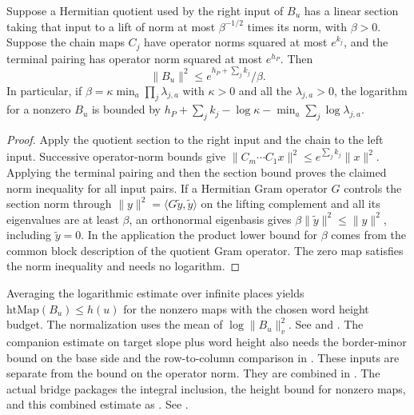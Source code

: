 \begin{lemma}\label{geo:descent}
Suppose a Hermitian quotient used by the right input of \(B_u\) has a linear section taking that input to a lift of norm at most \(\beta^{-1/2}\) times its norm, with \(\beta>0\). Suppose the chain maps \(C_j\) have operator norms squared at most \(e^{k_j}\), and the terminal pairing has operator norm squared at most \(e^{h_P}\). Then
\[
 \|B_u\|^2\le e^{h_P+\sum_j k_j}/\beta.
\]
In particular, if \(\beta=\kappa\min_a\prod_j\lambda_{j,a}\) with \(\kappa>0\) and all the \(\lambda_{j,a}>0\), the logarithm for a nonzero \(B_u\) is bounded by \(h_P+\sum_j k_j-\log\kappa-\min_a\sum_j\log\lambda_{j,a}\).
\end{lemma}
\begin{proof}
Apply the quotient section to the right input and the chain to the left input. Successive operator-norm bounds give \(\|C_m\cdots C_1 x\|^2\le e^{\sum_j k_j}\|x\|^2\). Applying the terminal pairing and then the section bound proves the claimed norm inequality for all input pairs. If a Hermitian Gram operator \(G\) controls the section norm through \(\|y\|^2=\langle G\widetilde y,\widetilde y\rangle\) on the lifting complement and all its eigenvalues are at least \(\beta\), an orthonormal eigenbasis gives \(\beta\|\widetilde y\|^2\le\|y\|^2\), including \(\widetilde y=0\). In the application the product lower bound for \(\beta\) comes from the common block description of the quotient Gram operator. The zero map satisfies the norm inequality and needs no logarithm.
\end{proof}

Averaging the logarithmic estimate over infinite places yields \(\mathrm{htMap}(B_u)\le h(u)\) for the nonzero maps with the chosen word height budget. The normalization uses the mean of \(\log\|B_u\|_v^2\). See  and . The companion estimate on target slope plus word height also needs the border-minor bound on the base side and the row-to-column comparison in . These inputs are separate from the bound on the operator norm. They are combined in . The actual bridge packages the integral inclusion, the height bound for nonzero maps, and this combined estimate as . See .

